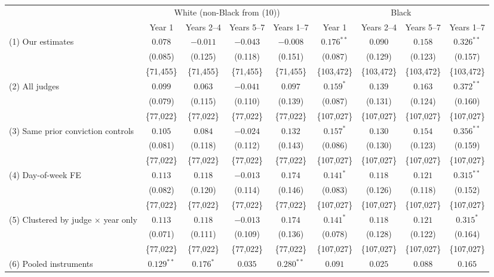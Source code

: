 \begin{tabular}{lcccccccc}
\toprule
 & \multicolumn{4}{c}{White (non-Black from (10))} & \multicolumn{4}{c}{Black} \\
\cmidrule(lr){2-5}\cmidrule(lr){6-9}
 & Year 1 & Years 2--4 & Years 5--7 & Years 1--7 & Year 1 & Years 2--4 & Years 5--7 & Years 1--7 \\
\midrule
(1) Our estimates & $0.078$ & $-0.011$ & $-0.043$ & $-0.008$ & $0.176^{**}$ & $0.090$ & $0.158$ & $0.326^{**}$ \\
 & (0.085) & (0.125) & (0.118) & (0.151) & (0.087) & (0.129) & (0.123) & (0.157) \\
 & \{71,455\} & \{71,455\} & \{71,455\} & \{71,455\} & \{103,472\} & \{103,472\} & \{103,472\} & \{103,472\} \\
(2) All judges & $0.099$ & $0.063$ & $-0.041$ & $0.097$ & $0.159^{*}$ & $0.139$ & $0.163$ & $0.372^{**}$ \\
 & (0.079) & (0.115) & (0.110) & (0.139) & (0.087) & (0.131) & (0.124) & (0.160) \\
 & \{77,022\} & \{77,022\} & \{77,022\} & \{77,022\} & \{107,027\} & \{107,027\} & \{107,027\} & \{107,027\} \\
(3) Same prior conviction controls & $0.105$ & $0.084$ & $-0.024$ & $0.132$ & $0.157^{*}$ & $0.130$ & $0.154$ & $0.356^{**}$ \\
 & (0.081) & (0.118) & (0.112) & (0.143) & (0.086) & (0.130) & (0.123) & (0.159) \\
 & \{77,022\} & \{77,022\} & \{77,022\} & \{77,022\} & \{107,027\} & \{107,027\} & \{107,027\} & \{107,027\} \\
(4) Day-of-week FE & $0.113$ & $0.118$ & $-0.013$ & $0.174$ & $0.141^{*}$ & $0.118$ & $0.121$ & $0.315^{**}$ \\
 & (0.082) & (0.120) & (0.114) & (0.146) & (0.083) & (0.126) & (0.118) & (0.152) \\
 & \{77,022\} & \{77,022\} & \{77,022\} & \{77,022\} & \{107,027\} & \{107,027\} & \{107,027\} & \{107,027\} \\
(5) Clustered by judge $\times$ year only & $0.113$ & $0.118$ & $-0.013$ & $0.174$ & $0.141^{*}$ & $0.118$ & $0.121$ & $0.315^{*}$ \\
 & (0.071) & (0.111) & (0.109) & (0.136) & (0.078) & (0.128) & (0.122) & (0.164) \\
 & \{77,022\} & \{77,022\} & \{77,022\} & \{77,022\} & \{107,027\} & \{107,027\} & \{107,027\} & \{107,027\} \\
(6) Pooled instruments & $0.129^{**}$ & $0.176^{*}$ & $0.035$ & $0.280^{**}$ & $0.091$ & $0.025$ & $0.088$ & $0.165$ \\

\end{tabular}
